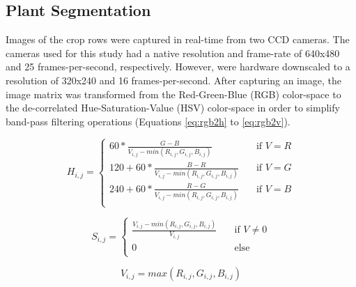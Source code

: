 \documentclass[authoryear]{elsarticle}
\begin{document}
\subsection{Plant Segmentation}
Images of the crop rows were captured in real-time from two CCD
cameras. The cameras used for this study had a native resolution and
frame-rate of 640x480 and 25 frames-per-second, respectively. However, 
were hardware downscaled to a resolution of 320x240 and 16
frames-per-second. After capturing an image, the image matrix was
transformed from the Red-Green-Blue (RGB) color-space to the
de-correlated Hue-Saturation-Value (HSV) color-space in order to
simplify band-pass filtering operations (Equations \ref{eq:rgb2h} to \ref{eq:rgb2v}).

\begin{equation}
  H_{i,j} =
  \begin{cases}
    60 * \frac{G-B}{V_{i,j}-min(R_{i,j},G_{i,j},B_{i,j})} & \quad \text{if } V = R \\
    120 + 60 * \frac{B-R}{V_{i,j}-min(R_{i,j},G_{i,j},B_{i,j})} & \quad \text{if } V = G \\
    240 + 60 * \frac{R-G}{V_{i,j}-min(R_{i,j},G_{i,j},B_{i,j})} & \quad \text{if } V = B \\
  \end{cases}
  \label{eq:rgb2h}
\end{equation}

\begin{equation}
  S_{i,j} = 
  \begin{cases}
    \frac{V_{i,j}-min(R_{i,j},G_{i,j},B_{i,j})}{V_{i,j}}  & \quad \text{if } V \neq 0 \\
    0  & \quad \text{else}\\
  \end{cases}
  \label{eq:rgb2s}
\end{equation}

\begin{equation}
  V_{i,j} = max(R_{i,j},G_{i,j},B_{i,j})
  \label{eq:rgb2v}
\end{equation}
\end{document}
